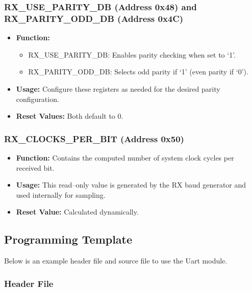 \subsubsection{RX\_USE\_PARITY\_DB (Address 0x48) and RX\_PARITY\_ODD\_DB (Address 0x4C)}
\begin{itemize}[noitemsep]
    \item \textbf{Function:}
    \begin{itemize}
        \item RX\_USE\_PARITY\_DB: Enables parity checking when set to ‘1’.
        \item RX\_PARITY\_ODD\_DB: Selects odd parity if ‘1’ (even parity if ‘0’).
    \end{itemize}
    \item \textbf{Usage:} Configure these registers as needed for the desired parity configuration.
    \item \textbf{Reset Values:} Both default to 0.
\end{itemize}

\subsubsection{RX\_CLOCKS\_PER\_BIT (Address 0x50)}
\begin{itemize}[noitemsep]
    \item \textbf{Function:} Contains the computed number of system clock cycles per received bit.
    \item \textbf{Usage:} This read–only value is generated by the RX baud generator and used internally for sampling.
    \item \textbf{Reset Value:} Calculated dynamically.
\end{itemize}

\subsection{Programming Template}

Below is an example header file and source file to use the Uart module.

\subsubsection{Header File}

